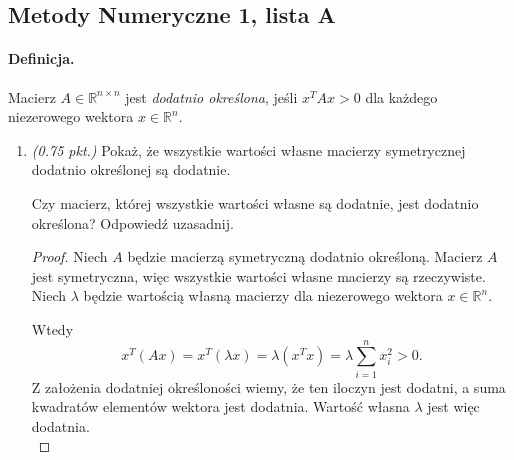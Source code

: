 \documentclass[12pt]{article}
\newcommand{\R}{\mathbb{R}}
\newenvironment{lista}[2][]{\newpage
\begin{center}
    \section[Lista \textbf{#2}]{Metody Numeryczne 1, lista #2}
\end{center}
\bigskip
#1
\begin{enumerate}[label=\textbf{#2\arabic*.}]}{\end{enumerate}}
\newcommand{\zad}[1][0.5]{\item \emph{(#1 pkt.) }}
\begin{document}
\begin{lista}[\paragraph*{Definicja.} Macierz $A\in\R^{n\times n}$ jest \emph{dodatnio określona}, jeśli $x^TAx>0$ dla każdego niezerowego wektora $x\in\R^n$.]{A}
\begin{mdframed}
        Macierze A i B są dodatnio określone ($a,b\in\R, \;a\neq0\lor b\neq0$):
        \[ [a\ b] A \begin{bmatrix} a \\ b \end{bmatrix} = a^2+b^2>0 \quad\text{oraz}\quad[a\ b] B \begin{bmatrix} a \\ b \end{bmatrix} = a^2+b^2>0.\]
        Ale wtedy macierz $AB = \begin{bmatrix} -1 & -3 \\ 3 & -1 \end{bmatrix}$ oraz
        \[[a\ b] AB \begin{bmatrix} a \\ b \end{bmatrix} = -a^2-b^2 < 0 \quad \text{(np.} \; [a\ b] = [1\ 1]\text{).} \]
        Czyli iloczyn dwóch macierzy dodatnio określonych nie musi taki być.\\
        \emph{W późniejszej części semestru zostanie wprowadzone Kryterium Sylvestra, które pozwoli badać określoność wyznacznikami danych macierzy symetrycznych.}
    \end{mdframed}

    \zad[0.75] Pokaż, że wszystkie wartości własne macierzy symetrycznej dodatnio określonej są dodatnie.

    Czy macierz, której wszystkie wartości własne są dodatnie, jest dodatnio określona? Odpowiedź uzasadnij.

    \begin{mdframed}
        \begin{proof}
            Niech $A$ będzie macierzą symetryczną dodatnio określoną. Macierz $A$ jest symetryczna, więc wszystkie wartości własne macierzy są rzeczywiste. \\ Niech $\lambda$ będzie wartością własną macierzy dla niezerowego wektora $x\in\R^n$.

            Wtedy
            \[ x^T(Ax) = x^T(\lambda x) = \lambda(x^Tx) = \lambda \sum_{i=1}^n x_i^2 > 0. \]
            Z założenia dodatniej określoności wiemy, że ten iloczyn jest dodatni, a suma kwadratów elementów wektora jest dodatnia. Wartość własna $\lambda$ jest więc dodatnia. \qedhere \\
        \end{proof}



\end{mdframed}
\end{lista}
\end{document}
